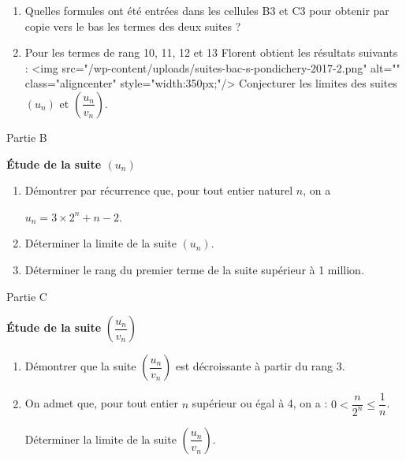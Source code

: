 \begin{center}
\end{center}
\begin{enumerate}
     \item
     Quelles formules ont été entrées dans les cellules B3 et C3 pour obtenir par copie vers le bas les termes des deux suites ?
     \item
     Pour les termes de rang 10, 11, 12 et 13 Florent obtient les résultats suivants :
     <img src="/wp-content/uploads/suites-bac-s-pondichery-2017-2.png" alt="" class="aligncenter" style="width:350px;"/>
     Conjecturer les limites des suites $\left(u_n\right)$ et $\left(\dfrac{u_n}{v_n} \right)$.
\end{enumerate}
\begin{h3}Partie B\end{h3}
\textbf{Étude de la suite  $\left(u_n\right)$}
\begin{enumerate}
     \item
     Démontrer par récurrence que, pour tout entier naturel $n$, on a
     \par
     $u_n = 3 \times  2^n+n-2$.
     \item
     Déterminer la limite de la suite $\left(u_n\right)$.
     \item
     Déterminer le rang du premier terme de la suite supérieur à 1 million.
\end{enumerate}
\begin{h3}Partie C\end{h3}
\textbf{Étude de la suite } $\left(\dfrac{u_n}{v_n} \right)$
\begin{enumerate}
     \item
     Démontrer que la suite $\left(\dfrac{u_n}{v_n} \right)$ est décroissante à partir du rang 3.
     \item
     On admet que, pour tout entier $n$ supérieur ou égal  à 4, on a : $0 < \dfrac{n}{2^n} \leqslant \dfrac{1}{n}$.
     \par
     Déterminer la limite de la suite $\left(\dfrac{u_n}{v_n} \right)$.
\end{enumerate}
